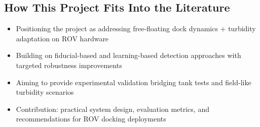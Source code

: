 \subsection{How This Project Fits Into the Literature}
\begin{itemize}
    \item Positioning the project as addressing free-floating dock dynamics + turbidity adaptation on ROV hardware
    \item Building on fiducial-based and learning-based detection approaches with targeted robustness improvements
    \item Aiming to provide experimental validation bridging tank tests and field-like turbidity scenarios
    \item Contribution: practical system design, evaluation metrics, and recommendations for ROV docking deployments
\end{itemize}